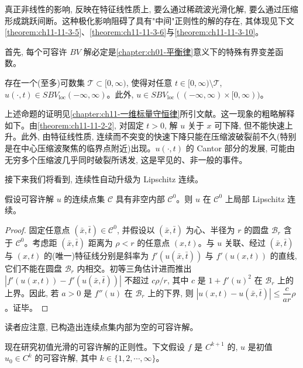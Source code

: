 \documentclass[../../main.tex]{subfiles}
\begin{document}
真正非线性的影响, 反映在特征线性质上, 要么通过稀疏波光滑化解, 要么通过压缩形成跳跃间断。这种极化影响阻碍了具有"中间"正则性的解的存在, 其体现见下文\cref{theorem:ch11-11-3-5}、\cref{theorem:ch11-11-3-6}与\cref{theorem:ch11-11-3-10}。

首先, 每个可容许 $BV$ 解必定是\cref{chapter:ch01-平衡律}意义下的特殊有界变差函数。


\begin{theorem}\label{theorem:ch11-11-3-5}
存在一个(至多)可数集 $\mathscr{T}\subset[0,\infty)$, 使得对任意 $t\in[0,\infty)\setminus\mathscr{T}$, $u(\cdot,t)\in SBV_{\mathrm{loc}}(-\infty,\infty)$。此外, $u\in SBV_{\mathrm{loc}}((-\infty,\infty)\times[0,\infty))$。
\end{theorem}

上述命题的证明见\cref{chapter:ch11-一维标量守恒律}所引文献。这一现象的粗略解释如下。由\cref{theorem:ch11-11-2-2}, 对固定 $t>0$, 解 $u$ 关于 $x$ 可下降, 但不能快速上升。此外, 由特征线性质, 连续而不突变的快速下降只能在压缩波破裂前不久(特别是在中心压缩波聚焦的临界点附近)出现。$u(\cdot,t)$ 的 Cantor 部分的发展, 可能由无穷多个压缩波几乎同时破裂所诱发, 这是罕见的、非一般的事件。


接下来我们将看到, 连续性自动升级为 Lipschitz 连续。

\begin{theorem}\label{theorem:ch11-11-3-6}
假设可容许解 $u$ 的连续点集 $\mathscr{C}$ 具有非空内部 $\mathscr{C}^0$。则 $u$ 在 $\mathscr{C}^0$ 上局部 Lipschitz 连续。
\end{theorem}

\begin{proof}
固定任意点 $(\bar x,\bar t)\in\mathscr{C}^0$, 并假设以 $(\bar x,\bar t)$ 为心、半径为 $r$ 的圆盘 $\mathscr{B}_r$ 含于 $\mathscr{C}^0$。考虑距 $(\bar x,\bar t)$ 距离为 $\rho<r$ 的任意点 $(x,t)$。与 $u$ 关联、经过 $(\bar x,\bar t)$ 与 $(x,t)$ 的(唯一)特征线分别是斜率为 $f'(u(\bar x,\bar t))$ 与 $f'(u(x,t))$ 的直线, 它们不能在圆盘 $\mathscr{B}_r$ 内相交。初等三角估计进而推出 $|f'(u(x,t))-f'(u(\bar x,\bar t))|$ 不超过 $c\rho/r$, 其中 $c$ 是 $1+f'(u)^2$ 在 $\mathscr{B}_r$ 上的上界。因此, 若 $a>0$ 是 $f''(u)$ 在 $\mathscr{B}_r$ 上的下界, 则 $|u(x,t)-u(\bar x,\bar t)|\leqslant\dfrac{c}{ar}\rho$。证毕。
\end{proof}

读者应注意, 已构造出连续点集内部为空的可容许解。

现在研究初值光滑的可容许解的正则性。下文假设 $f$ 是 $C^{k+1}$ 的, $u$ 是初值 $u_0\in C^k$ 的可容许解, 其中 $k\in\{1,2,\cdots,\infty\}$。
\end{document}
